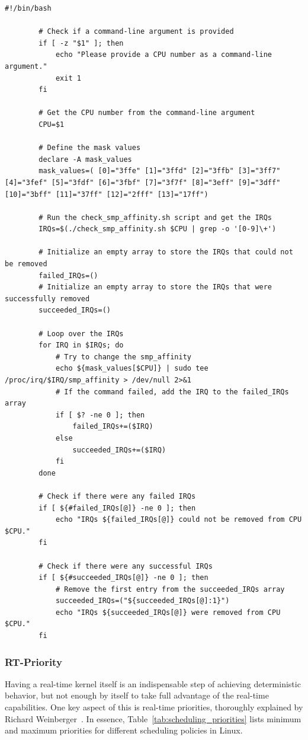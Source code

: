 \documentclass[MMR,Master,english]{style/twbook}
\begin{document}
\vspace*{-5em}
\begin{lstlisting}[name={Script to change IRQ Assignment of a CPU},label={script:change_smp_affinity}]
		#!/bin/bash

		# Check if a command-line argument is provided
		if [ -z "$1" ]; then
			echo "Please provide a CPU number as a command-line argument."
			exit 1
		fi
		
		# Get the CPU number from the command-line argument
		CPU=$1
		
		# Define the mask values
		declare -A mask_values
		mask_values=( [0]="3ffe" [1]="3ffd" [2]="3ffb" [3]="3ff7" [4]="3fef" [5]="3fdf" [6]="3fbf" [7]="3f7f" [8]="3eff" [9]="3dff" [10]="3bff" [11]="37ff" [12]="2fff" [13]="17ff")
		
		# Run the check_smp_affinity.sh script and get the IRQs
		IRQs=$(./check_smp_affinity.sh $CPU | grep -o '[0-9]\+')
		
		# Initialize an empty array to store the IRQs that could not be removed
		failed_IRQs=()
		# Initialize an empty array to store the IRQs that were successfully removed
		succeeded_IRQs=()
		
		# Loop over the IRQs
		for IRQ in $IRQs; do
			# Try to change the smp_affinity
			echo ${mask_values[$CPU]} | sudo tee /proc/irq/$IRQ/smp_affinity > /dev/null 2>&1
			# If the command failed, add the IRQ to the failed_IRQs array
			if [ $? -ne 0 ]; then
				failed_IRQs+=($IRQ)
			else
				succeeded_IRQs+=($IRQ)
			fi
		done
		
		# Check if there were any failed IRQs
		if [ ${#failed_IRQs[@]} -ne 0 ]; then
			echo "IRQs ${failed_IRQs[@]} could not be removed from CPU $CPU."
		fi
		
		# Check if there were any successful IRQs
		if [ ${#succeeded_IRQs[@]} -ne 0 ]; then
			# Remove the first entry from the succeeded_IRQs array
			succeeded_IRQs=("${succeeded_IRQs[@]:1}")
			echo "IRQs ${succeeded_IRQs[@]} were removed from CPU $CPU."
		fi		
\end{lstlisting}

\subsubsection{RT-Priority}
Having a real-time kernel itself is an indispensable step of achieving deterministic behavior, but not enough by itself to take full advantage of the real-time capabilities. One key aspect of this is real-time priorities, thoroughly explained by Richard Weinberger~\cite{LinuxProcessPriorities}. In essence, Table~\ref{tab:scheduling_priorities} lists minimum and maximum priorities for different scheduling policies in Linux.
\end{document}
